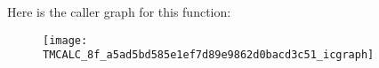 Here is the caller graph for this function\+:\nopagebreak
\begin{figure}[H]
\begin{center}
\leavevmode
\texttt{[image: TMCALC\_8f\_a5ad5bd585e1ef7d89e9862d0bacd3c51\_icgraph]}
\end{center}
\end{figure}


